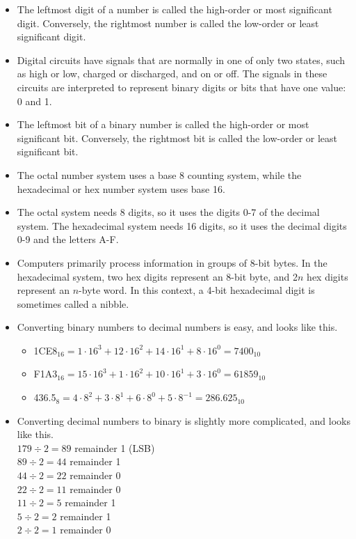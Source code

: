 \documentclass[10pt,a4paper]{article}
\begin{document}
\begin{itemize}
\item The leftmost digit of a number is called the high-order or most significant digit. Conversely, the rightmost number is called the low-order or least significant digit. 
\item Digital circuits have signals that are normally in one of only two states, such as high or low, charged or discharged, and on or off. The signals in these circuits are interpreted to represent binary digits or bits that have one value: 0 and 1. 
\item The leftmost bit of a binary number is called the high-order or most significant bit. Conversely, the rightmost bit is called the low-order or least significant bit.
\item The octal number system uses a base 8 counting system, while the hexadecimal or hex number system uses base 16. 
\item The octal system needs 8 digits, so it uses the digits 0-7 of the decimal system. The hexadecimal system needs 16 digits, so it uses the decimal digits 0-9 and the letters A-F.
\item Computers primarily process information in groups of 8-bit bytes. In the hexadecimal system, two hex digits represent an 8-bit byte, and 2$n$ hex digits represent an $n$-byte word. In this context, a 4-bit hexadecimal digit is sometimes called a nibble. 
\item Converting binary numbers to decimal numbers is easy, and looks like this.
\begin{itemize}
\item 1CE8$_{16}=1\cdot16^3+12\cdot16^2+14\cdot16^1+8\cdot16^0=7400_{10}$
\item F1A3$_{16}=15\cdot16^3+1\cdot16^2+10\cdot16^1+3\cdot16^0=61859_{10}$
\item 436.5$_{8}=4\cdot8^2+3\cdot8^1+6\cdot8^0+5\cdot8^{-1}=286.625_{10}$
\end{itemize}
\item Converting decimal numbers to binary is slightly more complicated, and looks like this.\\
$179\div2=89$ remainder 1 (LSB)\\
$89\div2=44$ remainder 1\\
$44\div2=22$ remainder 0\\
$22\div2=11$ remainder 0\\
$11\div2=5$ remainder 1\\
$5\div2=2$ remainder 1\\
$2\div2=1$ remainder 0\\

\end{itemize}
\end{document}
